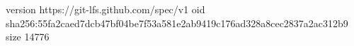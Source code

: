 version https://git-lfs.github.com/spec/v1
oid sha256:55fa2caed7dcb47bf04be7f53a581e2ab9419c176ad328a8cec2837a2ac312b9
size 14776
